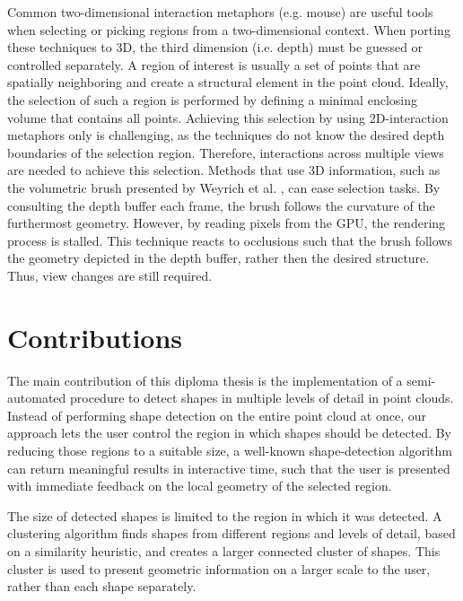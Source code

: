\par

Common two-dimensional interaction metaphors (e.g. mouse) are useful tools when selecting or picking regions from a two-dimensional context. When porting these techniques to 3D, the third dimension (i.e. depth) must be guessed or controlled separately. A region of interest is usually a set of points that are spatially neighboring and create a structural element in the point cloud. Ideally, the selection of such a region is performed by defining a minimal enclosing volume that contains all points. Achieving this selection by using 2D-interaction metaphors only is challenging, as the techniques do not know the desired depth boundaries of the selection region. Therefore, interactions across multiple views are needed to achieve this selection. Methods that use 3D information, such as the volumetric brush presented by Weyrich et al. \cite{weyrich2004post}, can ease selection tasks. By consulting the depth buffer each frame, the brush follows the curvature of the furthermost geometry. However, by reading pixels from the GPU, the rendering process is stalled. This technique reacts to occlusions such that the brush follows the geometry depicted in the depth buffer, rather then the desired structure. Thus, view changes are still required.


\section{Contributions}

The main contribution of this diploma thesis is the implementation of a semi-automated procedure to detect shapes in multiple levels of detail in point clouds. Instead of performing shape detection on the entire point cloud at once, our approach lets the user control the region in which shapes should be detected. By reducing those regions to a suitable size, a well-known shape-detection algorithm can return meaningful results in interactive time, such that the user is presented with immediate feedback on the local geometry of the selected region. 

\par

The size of detected shapes is limited to the region in which it was detected. A clustering algorithm finds shapes from different regions and levels of detail, based on a similarity heuristic, and creates a larger connected cluster of shapes. This cluster is used to present geometric information on a larger scale to the user, rather than each shape separately. 

